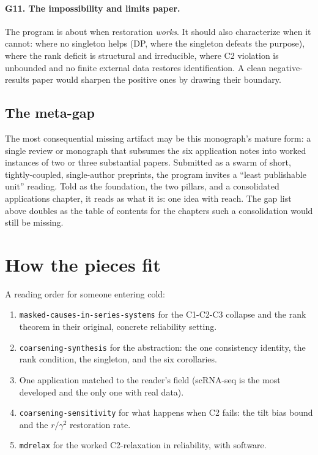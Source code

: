 \documentclass[11pt]{article}
\begin{document}
\paragraph{G11. The impossibility and limits paper.}
The program is about when restoration \emph{works}. It should also characterize when
it cannot: where no singleton helps (DP, where the singleton defeats the purpose),
where the rank deficit is structural and irreducible, where C2 violation is unbounded
and no finite external data restores identification. A clean negative-results paper
would sharpen the positive ones by drawing their boundary.

\subsection{The meta-gap}

The most consequential missing artifact may be this monograph's mature form: a single
review or monograph that subsumes the six application notes into worked instances of
two or three substantial papers. Submitted as a swarm of short, tightly-coupled,
single-author preprints, the program invites a ``least publishable unit'' reading.
Told as the foundation, the two pillars, and a consolidated applications chapter, it
reads as what it is: one idea with reach. The gap list above doubles as the table of
contents for the chapters such a consolidation would still be missing.

\section{How the pieces fit}

A reading order for someone entering cold:

\begin{enumerate}
\item \texttt{masked-causes-in-series-systems} for the C1-C2-C3 collapse and the
  rank theorem in their original, concrete reliability setting.
\item \texttt{coarsening-synthesis} for the abstraction: the one consistency
  identity, the rank condition, the singleton, and the six corollaries.
\item One application matched to the reader's field (scRNA-seq is the most developed
  and the only one with real data).
\item \texttt{coarsening-sensitivity} for what happens when C2 fails: the tilt bias
  bound and the $r/\gamma^2$ restoration rate.
\item \texttt{mdrelax} for the worked C2-relaxation in reliability, with software.
\end{enumerate}
\end{document}

